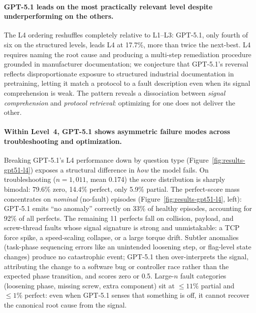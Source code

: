 \documentclass{article}
\begin{document}
\paragraph{GPT-5.1 leads on the most practically relevant level despite underperforming on the others.}
The L4 ordering reshuffles completely relative to L1--L3: GPT-5.1, only fourth of six on the structured levels, leads L4 at 17.7\%, more than twice the next-best. L4 requires naming the root cause and producing a multi-step remediation procedure grounded in manufacturer documentation; we conjecture that GPT-5.1's reversal reflects disproportionate exposure to structured industrial documentation in pretraining, letting it match a protocol to a fault description even when its signal comprehension is weak. The pattern reveals a dissociation between \emph{signal comprehension} and \emph{protocol retrieval}: optimizing for one does not deliver the other.

\paragraph{Within Level~4, GPT-5.1 shows asymmetric failure modes across troubleshooting and optimization.}
Breaking GPT-5.1's L4 performance down by question type (Figure~\ref{fig:results-gpt51-l4}) exposes a structural difference in \emph{how} the model fails. On troubleshooting ($n{=}1{,}011$, mean 0.174) the score distribution is sharply bimodal: 79.6\% zero, 14.4\% perfect, only 5.9\% partial. The perfect-score mass concentrates on \emph{nominal} (no-fault) episodes (Figure~\ref{fig:results-gpt51-l4}, left): GPT-5.1 emits ``no anomaly'' correctly on 33\% of healthy episodes, accounting for 92\% of all perfects. The remaining 11 perfects fall on collision, payload, and screw-thread faults whose signal signature is strong and unmistakable: a TCP force spike, a speed-scaling collapse, or a large torque drift. Subtler anomalies (task-phase sequencing errors like an unintended loosening step, or flag-level state changes) produce no catastrophic event; GPT-5.1 then over-interprets the signal, attributing the change to a software bug or controller race rather than the expected phase transition, and scores zero or 0.5. Large-$n$ fault categories (loosening phase, missing screw, extra component) sit at $\leq 11\%$ partial and $\leq 1\%$ perfect: even when GPT-5.1 senses that something is off, it cannot recover the canonical root cause from the signal.
\end{document}
